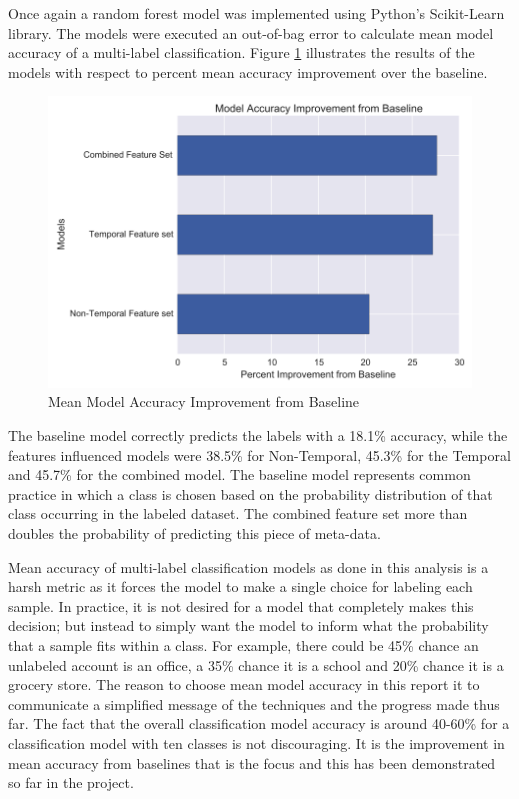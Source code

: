 Once again a random forest model was implemented using Python's Scikit-Learn library. The models were executed an out-of-bag error to calculate mean model accuracy of a multi-label classification. Figure \ref{fig:modelimprovement_ami} illustrates the results of the models with respect to percent mean accuracy improvement over the baseline.


\begin{figure}[ht!]
\begin{center}
\includegraphics[width=0.84\columnwidth]{figures/classificationimprovement_AMI/classificationimprovement_AMI}
\caption{{Mean Model Accuracy Improvement from Baseline
\label{fig:modelimprovement_ami}%
}}
\end{center}
\end{figure}

The baseline model correctly predicts the labels with a 18.1\% accuracy, while the features influenced models were 38.5\% for Non-Temporal, 45.3\% for the Temporal and 45.7\% for the combined model.  The baseline model represents common practice in which a class is chosen based on the probability distribution of that class occurring in the labeled dataset. The combined feature set more than doubles the probability of predicting this piece of meta-data.

Mean accuracy of multi-label classification models as done in this analysis is a harsh metric as it forces the model to make a single choice for labeling each sample. In practice, it is not desired for a model that completely makes this decision; but instead to simply want the model to inform what the probability that a sample fits within a class. For example, there could be 45\% chance an unlabeled account is an office, a 35\% chance it is a school and 20\% chance it is a grocery store. The reason to choose mean model accuracy in this report it to communicate a simplified message of the techniques and the progress made thus far. The fact that the overall classification model accuracy is around 40-60\% for a classification model with ten classes is not discouraging. It is the improvement in mean accuracy from baselines that is the focus and this has been demonstrated so far in the project. 

